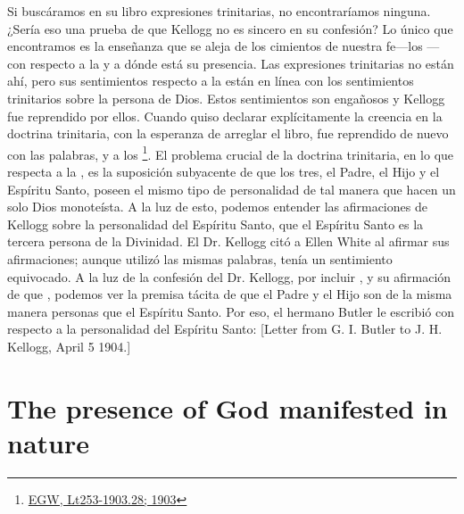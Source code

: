 Si buscáramos en su libro expresiones trinitarias, no encontraríamos ninguna. ¿Sería eso una prueba de que Kellogg no es sincero en su confesión? Lo único que encontramos es la enseñanza que se aleja de los cimientos de nuestra fe—los —con respecto a la  y a dónde está su presencia. Las expresiones trinitarias no están ahí, pero sus sentimientos respecto a la  están en línea con los sentimientos trinitarios sobre la persona de Dios. Estos sentimientos son engañosos y Kellogg fue reprendido por ellos. Cuando quiso declarar explícitamente la creencia en la doctrina trinitaria, con la esperanza de arreglar el libro, fue reprendido de nuevo con las palabras,  y a los \footnote{\href{https://egwwritings.org/?ref=en_Lt253-1903.28&para=9980.36}{EGW, Lt253-1903.28; 1903}}. El problema crucial de la doctrina trinitaria, en lo que respecta a la , es la suposición subyacente de que los tres, el Padre, el Hijo y el Espíritu Santo, poseen el mismo tipo de personalidad de tal manera que hacen un solo Dios monoteísta. A la luz de esto, podemos entender las afirmaciones de Kellogg sobre la personalidad del Espíritu Santo, que el Espíritu Santo es la tercera persona de la Divinidad. El Dr. Kellogg citó a Ellen White al afirmar sus afirmaciones; aunque utilizó las mismas palabras, tenía un sentimiento equivocado. A la luz de la confesión del Dr. Kellogg, por incluir , y su afirmación de que , podemos ver la premisa tácita de que el Padre y el Hijo son de la misma manera personas que el Espíritu Santo. Por eso, el hermano Butler le escribió con respecto a la personalidad del Espíritu Santo: [Letter from G. I. Butler to J. H. Kellogg, April 5 1904.]


\section*{The presence of God manifested in nature}


